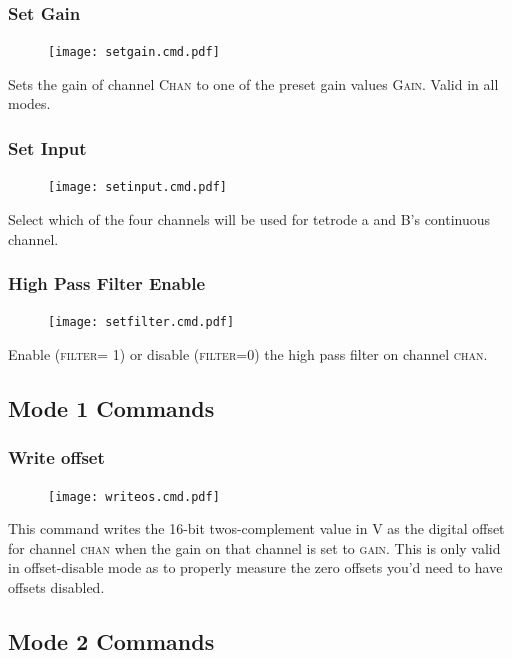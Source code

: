 \subsubsection{Set Gain}
\begin{figure}[h!]
\texttt{[image: setgain.cmd.pdf]}
\end{figure}

Sets the gain of channel \textsc{Chan} to one of the preset gain values \textsc{Gain}. Valid in all modes. 

\subsubsection{Set Input}
\begin{figure}[h!]
\texttt{[image: setinput.cmd.pdf]}
\end{figure}

Select which of the four channels will be used for tetrode a and B's continuous channel. 

\subsubsection{High Pass Filter Enable}
\begin{figure}[h!]
\texttt{[image: setfilter.cmd.pdf]}
\end{figure}

Enable (\textsc{filter}= 1) or disable (\textsc{filter}=0) the high pass filter on channel \textsc{chan}. 


\subsection{Mode 1 Commands}
\subsubsection{Write offset}
\begin{figure}[h!]
\texttt{[image: writeos.cmd.pdf]}
\end{figure}

This command writes the 16-bit twos-complement value in V as the digital offset for channel \textsc{chan} when the gain on that channel is set to \textsc{gain}. This is only valid in offset-disable mode as to properly measure the zero offsets you'd need to have offsets disabled. 

\subsection{Mode 2 Commands}
